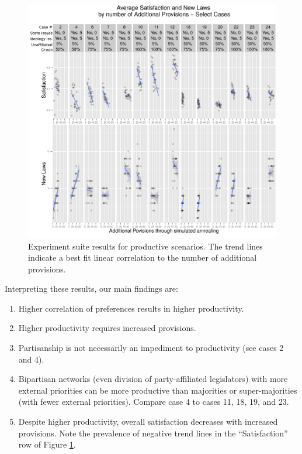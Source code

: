 \documentclass[pdftex,12pt,oribibl]{llncs}
\begin{document}
\begin{figure}[h!]
\centering
\includegraphics[width=4.75in]{combinedResults.png}
\caption[ ]{Experiment suite results for productive scenarios.  The trend lines indicate a best fit linear correlation to the number of additional provisions.} 
\label{combined}
\end{figure}

Interpreting these results, our main findings are:
\begin{enumerate}
\item Higher correlation of preferences results in higher productivity.
\item Higher productivity requires increased provisions.
\item Partisanship is not necessarily an impediment to productivity (see cases 2 and 4).
\item Bipartisan networks (even division of party-affiliated legislators) with more external priorities can be more productive than majorities or super-majorities (with fewer external priorities).  Compare case 4 to cases 11, 18, 19, and 23.
\item Despite higher productivity, overall satisfaction decreases with increased provisions.  Note the prevalence of negative trend lines in the ``Satisfaction'' row of Figure \ref{combined}.
\end{enumerate}
\end{document}

